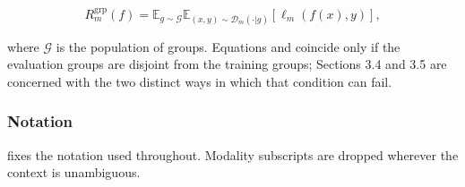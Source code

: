 \begin{equation}
\label{eq:6}
R_m^{\mathrm{grp}}(f) = \mathbb{E}_{g \sim \mathcal{G}} \mathbb{E}_{(x,y) \sim \mathcal{D}_m(\cdot | g)} [ \ell _m(f(x), y) ],
\end{equation}

where $\mathcal{G}$ is the population of groups. Equations  and  coincide only if the evaluation groups are disjoint from the training groups; Sections 3.4 and 3.5 are concerned with the two distinct ways in which that condition can fail.

\subsubsection{Notation}

 fixes the notation used throughout. Modality subscripts are dropped wherever the context is unambiguous.

